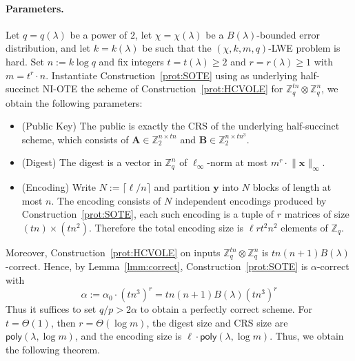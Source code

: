 \documentclass{article}
\newcommand{\poly}{\mathsf{poly}}
\begin{document}
{\paragraph{Parameters.} Let $q=q(\lambda)$ be a power of $2$, let $\chi=\chi(\lambda)$ be a
$B(\lambda)$-bounded error distribution, and let $k=k(\lambda)$ be such that
the $(\chi,k,m,q)$-LWE problem is hard. Set $n := k \log q $ and fix integers $t=t(\lambda)\ge 2$ and $r=r(\lambda)\ge 1$ with $m = t^r \cdot n$. Instantiate Construction~\ref{prot:SOTE} using as underlying
half-succinct NI-OTE the scheme of Construction~\ref{prot:HCVOLE}
for $\mathbb Z_q^{t n} \otimes \mathbb Z_q^{n}$, we obtain the following parameters:
\begin{itemize}
    \item (Public Key) The public is exactly the CRS of the underlying half-succinct scheme, which consists of $\mathbf{A} \in \mathbb Z_2^{n\times t n}$ and $\mathbf{B} \in \mathbb Z_2^{n\times t n^3}$.
    \item (Digest) The digest is a vector in $\mathbb Z_q^{n}$ of $\ell_\infty$-norm at most $m^{r}\cdot \lVert\mathbf{x}\rVert_\infty$.
    \item (Encoding) Write $N := \lceil \ell/n \rceil$ and partition $\mathbf y$ into $N$ blocks of length at most $n$. The encoding consists of $N$ independent encodings
    produced by Construction~\ref{prot:SOTE}, each such encoding
    is a tuple of $r$ matrices of size $(t n)\times (t n^2)$. Therefore the
    total encoding size is
    $\ell  r  t^2 n^2$
     elements of $\mathbb Z_q$.
\end{itemize}
Moreover, Construction~\ref{prot:HCVOLE} on inputs
    $\mathbb Z_q^{t n} \otimes \mathbb Z_q^n$ is $t n (n+1) B(\lambda)$-correct. Hence, by Lemma~\ref{lmm:correct}, 
    Construction~\ref{prot:SOTE} is
    $\alpha$-correct with
    \[
    \alpha:=\alpha_0 \cdot (t n^3)^r
    = t n (n+1) B(\lambda) (t n^3)^r
    \]
    Thus it suffices to set $q/p > 2\alpha$ to obtain a perfectly correct scheme. 
For $t=\Theta(1)$, then $r=\Theta(\log m)$, the digest size and CRS size are
$\poly(\lambda,\log m)$, and the encoding size is
    $\ell \cdot \poly(\lambda,\log m)$. Thus, we obtain the following theorem.}
\end{document}
